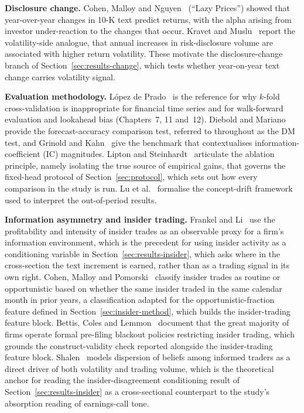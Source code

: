 \documentclass[logo,msc,ai]{infthesis}        %
\begin{document}
\textbf{Disclosure change.} Cohen, Malloy and Nguyen~\cite{cohen2020lazy} (``Lazy Prices'') showed that year-over-year changes in 10-K text predict returns, with the alpha arising from investor under-reaction to the changes that occur. Kravet and Muslu~\cite{kravet2013textual} report the volatility-side analogue, that annual increases in risk-disclosure volume are associated with higher return volatility. These motivate the disclosure-change branch of Section~\ref{sec:results-change}, which tests whether year-on-year text change carries volatility signal.

\textbf{Evaluation methodology.} López de Prado~\cite{de2018advances} is the reference for why $k$-fold cross-validation is inappropriate for financial time series and for walk-forward evaluation and lookahead bias (Chapters~7, 11 and~12). Diebold and Mariano~\cite{diebold1995comparing} provide the forecast-accuracy comparison test, referred to throughout as the DM test, and Grinold and Kahn~\cite{grinold2000active} give the benchmark that contextualises information-coefficient (IC) magnitudes. Lipton and Steinhardt~\cite{lipton2019troubling} articulate the ablation principle, namely isolating the true source of empirical gains, that governs the fixed-head protocol of Section~\ref{sec:protocol}, which sets out how every comparison in the study is run. Lu et al.\ \cite{lu2018learning} formalise the concept-drift framework used to interpret the out-of-period results.

\textbf{Information asymmetry and insider trading.} Frankel and Li~\cite{frankel2004characteristics} use the profitability and intensity of insider trades as an observable proxy for a firm's information environment, which is the precedent for using insider activity as a conditioning variable in Section~\ref{sec:results-insider}, which asks where in the cross-section the text increment is earned, rather than as a trading signal in its own right. Cohen, Malloy and Pomorski~\cite{cohen2012decoding} classify insider trades as routine or opportunistic based on whether the same insider traded in the same calendar month in prior years, a classification adapted for the opportunistic-fraction feature defined in Section~\ref{sec:insider-method}, which builds the insider-trading feature block. Bettis, Coles and Lemmon~\cite{bettis2000corporate} document that the great majority of firms operate formal pre-filing blackout policies restricting insider trading, which grounds the construct-validity check reported alongside the insider-trading feature block. Shalen~\cite{shalen1993volume} models dispersion of beliefs among informed traders as a direct driver of both volatility and trading volume, which is the theoretical anchor for reading the insider-disagreement conditioning result of Section~\ref{sec:results-insider} as a cross-sectional counterpart to the study's absorption reading of earnings-call tone.
\end{document}
